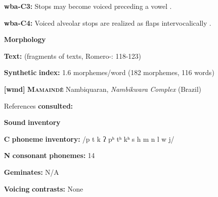 \begin{styleBody}
\textbf{wba-C3:} Stops may become voiced preceding a vowel \citep[107]{Arinterol1997}.
\end{styleBody}

\begin{styleBody}
\textbf{wba-C4:} Voiced alveolar stops are realized as flaps intervocalically \citep[107]{Arinterol1997}.
\end{styleBody}

\begin{styleBody}
\textbf{Morphology}
\end{styleBody}

\begin{styleBody}
\textbf{Text:} (fragments of texts, Romero-\citealt{Figeroa1997}: 118-123)
\end{styleBody}

\begin{styleBody}
\textbf{Synthetic} \textbf{index:} 1.6 morphemes/word (182 morphemes, 116 words)
\end{styleBody}

\begin{styleBody}
\textbf{[wmd]} \textbf{\textsc{Mamaindê}}  Nambiquaran, \textit{Nambikwara} \textit{Complex} (Brazil)
\end{styleBody}

\begin{styleBody}
References \textbf{consulted:} \citet{Eberhard2009}
\end{styleBody}

\begin{styleBody}
\textbf{Sound} \textbf{inventory}
\end{styleBody}

\begin{styleBody}
\textbf{C} \textbf{phoneme} \textbf{inventory:} /p t k ʔ pʰ tʰ kʰ s h m n l w j/
\end{styleBody}

\begin{styleBody}
\textbf{N} \textbf{consonant} \textbf{phonemes:} 14
\end{styleBody}

\begin{styleBody}
\textbf{Geminates:} N/A
\end{styleBody}

\begin{styleBody}
\textbf{Voicing} \textbf{contrasts:} None
\end{styleBody}

